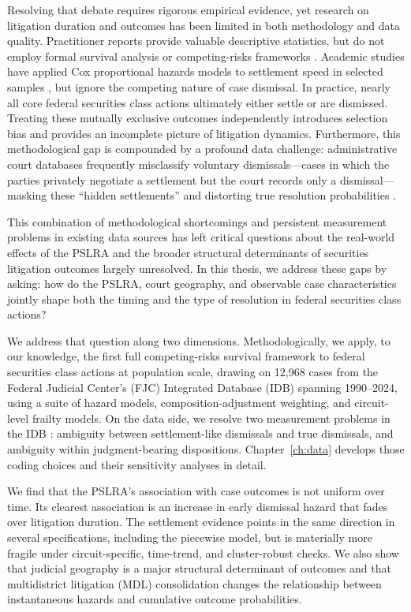 Resolving that debate requires rigorous empirical evidence, yet
research on litigation duration and outcomes has been limited in
both methodology and data quality. Practitioner reports provide
valuable descriptive statistics, but do not employ formal survival
analysis or competing-risks frameworks \citep{cornerstone2024,
nera2024}. Academic studies have applied Cox proportional hazards
models to settlement speed in selected samples \citep{brochet2014},
but ignore the competing nature of case dismissal. In practice, nearly all core federal securities class actions
ultimately either settle or are dismissed. Treating these mutually
exclusive outcomes independently introduces selection bias and
provides an incomplete picture of litigation dynamics. Furthermore,
this methodological gap is compounded by a profound data challenge:
administrative court databases frequently misclassify voluntary
dismissals---cases in which the parties privately negotiate a
settlement but the court records only a dismissal---masking these
``hidden settlements'' and distorting true resolution probabilities
\citep{scales2024}.

This combination of methodological shortcomings and persistent
measurement problems in existing data sources has left critical
questions about the real-world effects of the PSLRA and the broader
structural determinants of securities litigation outcomes largely
unresolved. In this thesis, we address these gaps by asking: how do
the PSLRA, court geography, and observable case characteristics jointly shape
both the timing and the type of resolution in federal securities
class actions?

We address that question along two dimensions. Methodologically, we apply, to our
knowledge, the first full competing-risks survival framework to
federal securities class actions at population scale, drawing on
12,968 cases from the Federal Judicial Center's (FJC) Integrated
Database (IDB) spanning 1990--2024, using a suite of hazard models,
composition-adjustment weighting, and circuit-level frailty models.
On the data side, we resolve two measurement problems in the IDB
\citep{clermont2002, alexander1991}: ambiguity between
settlement-like dismissals and true dismissals, and ambiguity within
judgment-bearing dispositions. Chapter~\ref{ch:data} develops those
coding choices and their sensitivity analyses in detail.

We find that the PSLRA's association with case
outcomes is not uniform over time. Its clearest association is an
increase in early dismissal hazard that fades over litigation
duration. The settlement evidence points in the same direction in
several specifications, including the piecewise model, but is
materially more fragile under circuit-specific, time-trend, and
cluster-robust checks. We also show that judicial geography is a
major structural determinant of outcomes and that multidistrict
litigation (MDL) consolidation changes the relationship between
instantaneous hazards and cumulative outcome probabilities.

